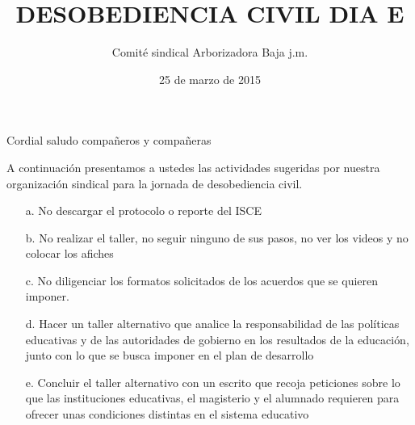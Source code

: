 \documentclass[10pt]{article}
\author{Comité sindical Arborizadora Baja j.m.}
\title{DESOBEDIENCIA CIVIL DIA E}
\date{25 de marzo de 2015}
\begin{document}
\maketitle
Cordial saludo compañeros y compañeras

A continuación presentamos a ustedes las actividades sugeridas por nuestra organización sindical para la jornada de desobediencia civil.
\begin{itemize}
\item[a.] No descargar el protocolo o reporte del ISCE
\item[b.] No realizar el taller, no seguir ninguno de sus pasos, no ver los videos y no colocar los afiches
\item[c.] No diligenciar los formatos solicitados de los acuerdos que se quieren imponer.
\item[d.] Hacer un taller alternativo que analice la responsabilidad de las políticas educativas y de las autoridades de gobierno en los resultados de la educación, junto con lo que se busca imponer en el plan de desarrollo
\item[e.] Concluir el taller alternativo con un escrito que recoja peticiones sobre lo que las instituciones educativas, el magisterio y el alumnado requieren para ofrecer unas condiciones distintas en el sistema educativo
\end{itemize}
\end{document}

